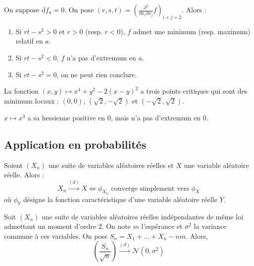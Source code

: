   \begin{example}
    On suppose $\mathrm{d}f_a = 0$. On pose $(r,s,t) = \left(  \frac{\partial^2}{\partial x_i \partial x_j} f \right)_{i+j=2}$. Alors :
    \begin{enumerate}[label={\bfseries(\roman*)}]
      \item Si $rt-s^2 > 0$ et $r > 0$ (resp. $r < 0$), $f$ admet une minimum (resp. maximum) relatif en $a$.
      \item Si $rt-s^2 < 0$, $f$ n'a pas d'extremum en $a$.
      \item Si $rt-s^2 = 0$, on ne peut rien conclure.
    \end{enumerate}
  \end{example}

  \begin{example}
    La fonction $(x,y) \mapsto x^4 + y^2 - 2(x-y)^2$ a trois points critiques qui sont des minimum locaux : $(0,0)$, $(\sqrt{2},-\sqrt{2})$ et $(-\sqrt{2},\sqrt{2})$.
  \end{example}

  \begin{cexample}
    $x \mapsto x^3$ a sa hessienne positive en $0$, mais n'a pas d'extremum en $0$.
  \end{cexample}

  \subsection{Application en probabilités}


  \begin{theorem}
    Soient $(X_n)$ une suite de variables aléatoires réelles et $X$ une variable aléatoire réelle. Alors :
    \[ X_n \overset{(d)}{\longrightarrow} X \iff \phi_{X_n} \text{ converge simplement vers } \phi_X \]
    où $\phi_Y$ désigne la fonction caractéristique d'une variable aléatoire réelle $Y$.
  \end{theorem}


  \begin{theorem}
    Soit $(X_n)$ une suite de variables aléatoires réelles indépendantes de même loi admettant un moment d'ordre $2$. On note $m$ l'espérance et $\sigma^2$ la variance commune à ces variables. On pose $S_n = X_1 + \dots + X_n - nm$. Alors,
    \[ \left ( \frac{S_n}{\sqrt{n}} \right) \overset{(d)}{\longrightarrow} \mathcal{N}(0, \sigma^2) \]
  \end{theorem}

